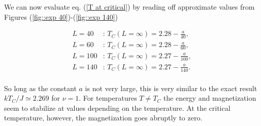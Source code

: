 \documentclass[11pt]{article}
\begin{document}
\begin{flushleft}
We can now evaluate eq. (\ref{T at critical}) by reading off approximate values from Figures (\ref{fig::exp 40})-(\ref{fig::exp 140})

\begin{align*}
L=40 & \text{: }T_C(L = \infty ) = 2.28 - \frac{a}{40},\\
L=60 & \text{: }T_C(L = \infty ) = 2.28 - \frac{a}{60},\\
L=100 & \text{: }T_C(L = \infty ) = 2.27 - \frac{a}{100},\\
L=140 & \text{: }T_C(L = \infty ) = 2.27 - \frac{a}{140}.\\
\end{align*}

So long as the constant $a$ is not very large, this is very similar to the exact result $kT_C/J \simeq 2.269$ for $\nu =1$. For temperatures $T \neq T_C$ the energy and magnetization seem to stabilize at values depending on the temperature. At the critical temperature, however, the magnetization goes abruptly to zero.
\end{flushleft}


\nocite{*}

{}

\end{document}
